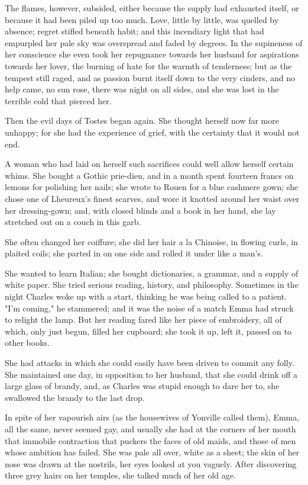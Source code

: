 \documentclass{tufte-book}
\begin{document}
The flames, however, subsided, either because the supply had exhausted
itself, or because it had been piled up too much. Love, little by
little, was quelled by absence; regret stifled beneath habit; and this
incendiary light that had empurpled her pale sky was overspread and
faded by degrees. In the supineness of her conscience she even took her
repugnance towards her husband for aspirations towards her lover, the
burning of hate for the warmth of tenderness; but as the tempest still
raged, and as passion burnt itself down to the very cinders, and no help
came, no sun rose, there was night on all sides, and she was lost in the
terrible cold that pierced her.

Then the evil days of Tostes began again. She thought herself now far
more unhappy; for she had the experience of grief, with the certainty
that it would not end.

A woman who had laid on herself such sacrifices could well allow herself
certain whims. She bought a Gothic prie-dieu, and in a month spent
fourteen francs on lemons for polishing her nails; she wrote to Rouen
for a blue cashmere gown; she chose one of Lheureux's finest scarves,
and wore it knotted around her waist over her dressing-gown; and, with
closed blinds and a book in her hand, she lay stretched out on a couch
in this garb.

She often changed her coiffure; she did her hair a la Chinoise, in
flowing curls, in plaited coils; she parted in on one side and rolled it
under like a man's.

She wanted to learn Italian; she bought dictionaries, a grammar, and
a supply of white paper. She tried serious reading, history, and
philosophy. Sometimes in the night Charles woke up with a start,
thinking he was being called to a patient. "I'm coming," he stammered;
and it was the noise of a match Emma had struck to relight the lamp. But
her reading fared like her piece of embroidery, all of which, only just
begun, filled her cupboard; she took it up, left it, passed on to other
books.

She had attacks in which she could easily have been driven to commit any
folly. She maintained one day, in opposition to her husband, that she
could drink off a large glass of brandy, and, as Charles was stupid
enough to dare her to, she swallowed the brandy to the last drop.

In spite of her vapourish airs (as the housewives of Yonville called
them), Emma, all the same, never seemed gay, and usually she had at the
corners of her mouth that immobile contraction that puckers the faces of
old maids, and those of men whose ambition has failed. She was pale all
over, white as a sheet; the skin of her nose was drawn at the nostrils,
her eyes looked at you vaguely. After discovering three grey hairs on
her temples, she talked much of her old age.
\end{document}
